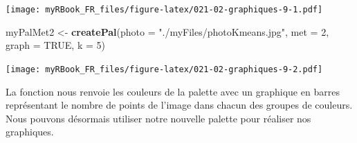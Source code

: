 \documentclass[
]{book}
\newenvironment{Shaded}{\begin{snugshade}}{\end{snugshade}}
\newcommand{\DataTypeTok}[1]{\textcolor[rgb]{0.13,0.29,0.53}{#1}}
\newcommand{\DecValTok}[1]{\textcolor[rgb]{0.00,0.00,0.81}{#1}}
\newcommand{\KeywordTok}[1]{\textcolor[rgb]{0.13,0.29,0.53}{\textbf{#1}}}
\newcommand{\NormalTok}[1]{#1}
\newcommand{\OtherTok}[1]{\textcolor[rgb]{0.56,0.35,0.01}{#1}}
\newcommand{\StringTok}[1]{\textcolor[rgb]{0.31,0.60,0.02}{#1}}
\begin{document}
\texttt{[image: myRBook\_FR\_files/figure-latex/021-02-graphiques-9-1.pdf]}

\begin{Shaded}
\begin{Highlighting}[]
\NormalTok{myPalMet2 <-}\StringTok{ }\KeywordTok{createPal}\NormalTok{(}\DataTypeTok{photo =} \StringTok{"./myFiles/photoKmeans.jpg"}\NormalTok{, }
  \DataTypeTok{met =} \DecValTok{2}\NormalTok{, }\DataTypeTok{graph =} \OtherTok{TRUE}\NormalTok{, }\DataTypeTok{k =} \DecValTok{5}\NormalTok{)}
\end{Highlighting}
\end{Shaded}

\texttt{[image: myRBook\_FR\_files/figure-latex/021-02-graphiques-9-2.pdf]}

La fonction nous renvoie les couleurs de la palette avec un graphique en barres représentant le nombre de points de l'image dans chacun des groupes de couleurs. Nous pouvons désormais utiliser notre nouvelle palette pour réaliser nos graphiques.
\end{document}
